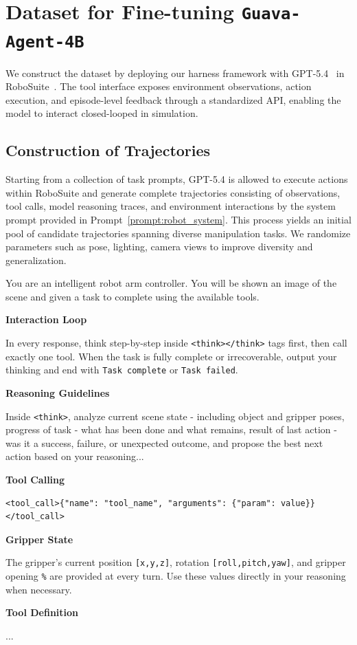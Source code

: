 \appendix

\section{Dataset for Fine-tuning \texttt{Guava-Agent-4B}}
We construct the dataset by deploying our harness framework with GPT-5.4~\cite{openai2026gpt54} in RoboSuite~\citep{robosuite2020}. The tool interface exposes environment observations, action execution, and episode-level feedback through a standardized API, enabling the model to interact closed-looped in simulation.

\subsection{Construction of Trajectories}

Starting from a collection of task prompts, GPT-5.4 is allowed to execute actions within RoboSuite and generate complete trajectories consisting of observations, tool calls, model reasoning traces, and environment interactions by the system prompt provided in Prompt~\ref{prompt:robot_system}. This process yields an initial pool of candidate trajectories spanning diverse manipulation tasks. We randomize parameters such as pose, lighting, camera views to improve diversity and generalization. 

\begin{promptbox}
\label{prompt:robot_system}
You are an intelligent robot arm controller. You will be shown an image of the scene and given a task to complete using the available tools.

\medskip
\noindent\textbf{Interaction Loop}

In every response, think step-by-step inside \texttt{<think></think>} tags first, then call exactly one tool. When the task is fully complete or irrecoverable, output your thinking and end with \texttt{Task complete} or \texttt{Task failed}.

\medskip
\noindent\textbf{Reasoning Guidelines}

Inside \texttt{<think>}, analyze current scene state - including object and gripper poses, progress of task - what has been done and what remains, result of last action - was it a success, failure, or unexpected outcome, and propose the best next action based on your reasoning...

\medskip
\noindent\textbf{Tool Calling}

\begin{verbatim}
<tool_call>{"name": "tool_name", "arguments": {"param": value}}</tool_call>
\end{verbatim}

\medskip
\noindent\textbf{Gripper State}

The gripper's current position \texttt{[x,y,z]}, rotation \texttt{[roll,pitch,yaw]}, and gripper opening \texttt{\%} are provided at every turn. Use these values directly in your reasoning when necessary.

\medskip
\noindent\textbf{Tool Definition}

...


\end{promptbox}


